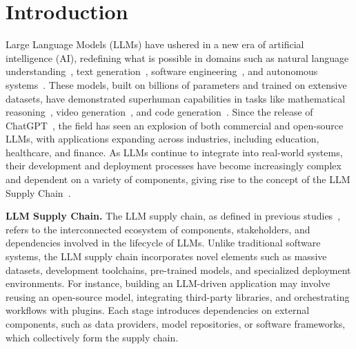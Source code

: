 \section{Introduction}
Large Language Models (LLMs) have ushered in a new era of artificial intelligence (AI), redefining what is possible in domains such as natural language understanding~\cite{daye2024llmcodeunderstanding,lu2024visionunderstanding,zhao2024llmsurvey}, text generation~\cite{zhao2024llmsurvey,roberto2023generativeai}, software engineering~\cite{hou2024llm4se,jin2024agents4se,wang2024agentsinse}, and autonomous systems~\cite{wu2023autogen,wang2024ala}. These models, built on billions of parameters and trained on extensive datasets, have demonstrated superhuman capabilities in tasks like mathematical reasoning~\cite{janice2024mathematical}, video generation~\cite{maaz2024videochatgpt}, and code generation~\cite{priyan2022codegeneration}. Since the release of ChatGPT~\cite{chatgpt}, the field has seen an explosion of both commercial and open-source LLMs, with applications expanding across industries, including education, healthcare, and finance. As LLMs continue to integrate into real-world systems, their development and deployment processes have become increasingly complex and dependent on a variety of components, giving rise to the concept of the LLM Supply Chain~\cite{wang2024llmsc}.

\noindent \textbf{LLM Supply Chain.} The LLM supply chain, as defined in previous studies~\cite{wang2024llmsc,hu2024llmsc,huang2024llmsc}, refers to the interconnected ecosystem of components, stakeholders, and dependencies involved in the lifecycle of LLMs. Unlike traditional software systems, the LLM supply chain incorporates novel elements such as massive datasets, development toolchains, pre-trained models, and specialized deployment environments. For instance, building an LLM-driven application may involve reusing an open-source model, integrating third-party libraries, and orchestrating workflows with plugins. Each stage introduces dependencies on external components, such as data providers, model repositories, or software frameworks, which collectively form the supply chain.

